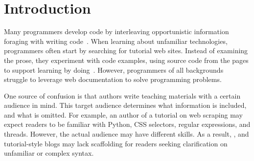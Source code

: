 \section{Introduction}

Many programmers develop code by interleaving opportunistic information foraging with writing code~\cite{brandt_two_2009,brandt_example-centric_2010}.
When learning about unfamiliar technologies, programmers often start by searching for tutorial web sites.
Instead of examining the prose, they experiment with code examples, using source code from the pages to support learning by doing~\cite{brandt_two_2009}.
However, programmers of all backgrounds~\cite{duala-ekoko_asking_2012,dorn_lost_2013,dorn_learning_2010} struggle to leverage web documentation to solve programming problems.

One source of confusion is that authors write teaching materials with a certain audience in mind.
This target audience determines what  information is included, and what is omitted.
For example, an author of a tutorial on web scraping may expect readers to be familiar with Python, CSS selectors, regular expressions, and threads.
However, the actual audience may have different skills.
As a result, , and tutorial-style blogs may lack  scaffolding for readers seeking clarification on unfamiliar or complex syntax.

